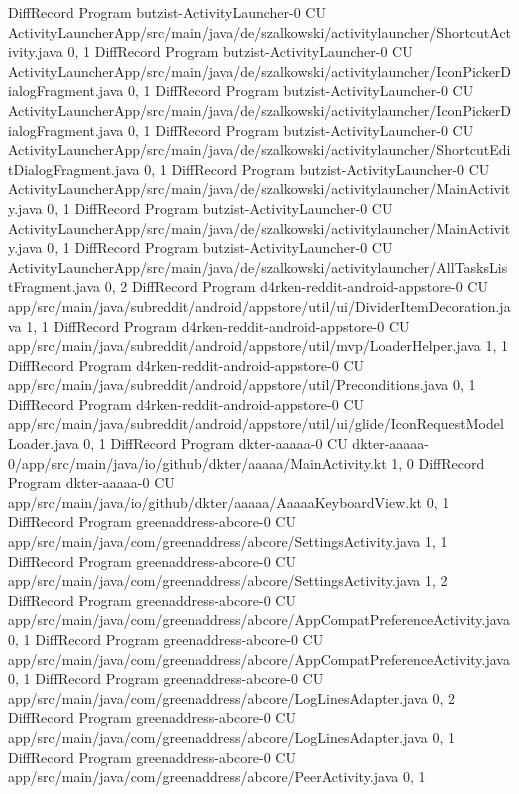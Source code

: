 DiffRecord Program butzist-ActivityLauncher-0 CU ActivityLauncherApp/src/main/java/de/szalkowski/activitylauncher/ShortcutActivity.java  {0, 1}
DiffRecord Program butzist-ActivityLauncher-0 CU ActivityLauncherApp/src/main/java/de/szalkowski/activitylauncher/IconPickerDialogFragment.java  {0, 1}
DiffRecord Program butzist-ActivityLauncher-0 CU ActivityLauncherApp/src/main/java/de/szalkowski/activitylauncher/IconPickerDialogFragment.java  {0, 1}
DiffRecord Program butzist-ActivityLauncher-0 CU ActivityLauncherApp/src/main/java/de/szalkowski/activitylauncher/ShortcutEditDialogFragment.java  {0, 1}
DiffRecord Program butzist-ActivityLauncher-0 CU ActivityLauncherApp/src/main/java/de/szalkowski/activitylauncher/MainActivity.java  {0, 1}
DiffRecord Program butzist-ActivityLauncher-0 CU ActivityLauncherApp/src/main/java/de/szalkowski/activitylauncher/MainActivity.java  {0, 1}
DiffRecord Program butzist-ActivityLauncher-0 CU ActivityLauncherApp/src/main/java/de/szalkowski/activitylauncher/AllTasksListFragment.java  {0, 2}
DiffRecord Program d4rken-reddit-android-appstore-0 CU app/src/main/java/subreddit/android/appstore/util/ui/DividerItemDecoration.java  {1, 1}
DiffRecord Program d4rken-reddit-android-appstore-0 CU app/src/main/java/subreddit/android/appstore/util/mvp/LoaderHelper.java  {1, 1}
DiffRecord Program d4rken-reddit-android-appstore-0 CU app/src/main/java/subreddit/android/appstore/util/Preconditions.java  {0, 1}
DiffRecord Program d4rken-reddit-android-appstore-0 CU app/src/main/java/subreddit/android/appstore/util/ui/glide/IconRequestModelLoader.java  {0, 1}
DiffRecord Program dkter-aaaaa-0 CU dkter-aaaaa-0/app/src/main/java/io/github/dkter/aaaaa/MainActivity.kt  {1, 0}
DiffRecord Program dkter-aaaaa-0 CU app/src/main/java/io/github/dkter/aaaaa/AaaaaKeyboardView.kt  {0, 1}
DiffRecord Program greenaddress-abcore-0 CU app/src/main/java/com/greenaddress/abcore/SettingsActivity.java  {1, 1}
DiffRecord Program greenaddress-abcore-0 CU app/src/main/java/com/greenaddress/abcore/SettingsActivity.java  {1, 2}
DiffRecord Program greenaddress-abcore-0 CU app/src/main/java/com/greenaddress/abcore/AppCompatPreferenceActivity.java  {0, 1}
DiffRecord Program greenaddress-abcore-0 CU app/src/main/java/com/greenaddress/abcore/AppCompatPreferenceActivity.java  {0, 1}
DiffRecord Program greenaddress-abcore-0 CU app/src/main/java/com/greenaddress/abcore/LogLinesAdapter.java  {0, 2}
DiffRecord Program greenaddress-abcore-0 CU app/src/main/java/com/greenaddress/abcore/LogLinesAdapter.java  {0, 1}
DiffRecord Program greenaddress-abcore-0 CU app/src/main/java/com/greenaddress/abcore/PeerActivity.java  {0, 1}
